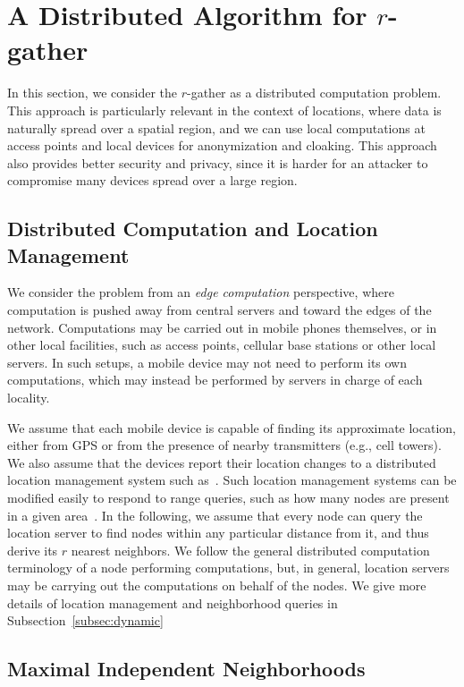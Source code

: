 
\section{A Distributed Algorithm for \lowercase{$r$-gather}}


In this section, we consider the $r$-gather as a distributed computation problem. This approach is particularly relevant in the context of locations, where data is naturally spread over a spatial region, and we can use local computations at access points and local devices for anonymization and cloaking. This approach also provides better security and privacy, since it is harder for an attacker to compromise many devices spread over a large region.

\subsection{Distributed Computation and Location Management}

We consider the problem from an {\em edge computation} perspective, where computation is pushed away from central servers and toward the edges of the network. Computations may be carried out in mobile phones themselves, or in other local facilities, such as access points, cellular base stations or other local servers. In such setups, a mobile device may not need to perform its own computations, which may instead be performed by servers in charge of each locality. 

We assume that each mobile device is capable of finding its approximate location, either from GPS or from the presence of nearby transmitters (e.g., cell towers). We also assume that the devices report their location changes to a distributed location management system such as~\cite{abraham04LLS}. Such location management systems can be modified easily to respond to range queries, such as how many nodes are present in a given area~\cite{Sarkar:2010:forms}. In the following, we assume that every node can query the location server to find nodes within any particular distance from it, and thus derive its $r$ nearest neighbors. We follow the general distributed computation terminology of a node performing computations, but,  in general, location servers may be carrying out the computations on behalf of the nodes. We give more details of location management and neighborhood queries in Subsection~\ref{subsec:dynamic}


\subsection{Maximal Independent Neighborhoods}

